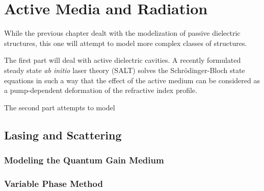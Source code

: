 \chapter{Active Media and Radiation}
While the previous chapter dealt with the modelization
of passive dielectric structures, this one will attempt
to model more complex classes of structures. 

The first part will
deal with active dielectric cavities. A recently formulated
steady state \textit{ab initio} laser theory (SALT) solves the 
Schrödinger-Bloch state equations in such a way that the effect of
the active medium can be considered as a pump-dependent
deformation of the refractive index profile.  

The second part attempts to model 

\section{Lasing and Scattering}

\subsection{Modeling the Quantum Gain Medium}

\subsection{Variable Phase Method}





% 
% 	      
% 
% 
% 
